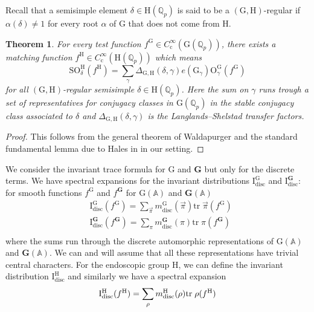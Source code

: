 \documentclass[10pt]{amsart}
\numberwithin{equation}{section}
\newtheorem{theorem}[equation]{Theorem}
\theoremstyle{definition}
\def\bfG{\mathbf{G}}
\def\QQ{\mathbb{Q}}
\def\rmc{\mathrm{c}}
\def\rmG{\mathrm{G}}
\def\rmH{\mathrm{H}}
\def\rmI{\mathrm{I}}
\def\rmO{\mathrm{O}}
\begin{document}
Recall that a semisimple element $\delta\in\rmH(\QQ_{p})$ is said to be a $(\rmG, \rmH)$-regular if $\alpha(\delta)\neq 1$ for every root $\alpha$ of $\rmG$ that does not come from $\rmH$.
\begin{theorem}
For every test function $f^{\rmG}\in C^{\infty}_{\rmc}(\rmG(\QQ_{p}))$, there exists a matching function $f^{\rmH}\in C^{\infty}_{\rmc}(\rmH(\QQ_{p}))$ which means
\begin{equation*}
\mathrm{SO}^{\rmH}_{\delta}(f^{\rmH})=\sum\limits_{\gamma}\Delta_{\rmG, \rmH}(\delta,\gamma)e(\rmG_{\gamma}){\rmO}^{\rmG}_{\gamma}(f^{\rmG})
\end{equation*}
for all $(\rmG, \rmH)$-regular semisimple $\delta\in\rmH(\QQ_{p})$. Here the sum on $\gamma$ runs trough a set of representatives for conjugacy classes in $\rmG(\QQ_{p})$ in the stable conjugacy class associated to $\delta$ and $\Delta_{\rmG, \rmH}(\delta, \gamma)$ is the Langlands--Shelstad transfer factors.
\end{theorem}
\begin{proof}
This follows from the general theorem of Waldapurger \cite[\S1.5 Th\`eor\'em]{Wal-trans} and the standard fundamental lemma due to Hales in \cite[Proposition]{Hal97} in our setting.
\end{proof}
We consider the invariant trace formula for $\rmG$ and $\bfG$ but only for the discrete 
terms. We have spectral expansions for the invariant distributions $\rmI^{\rmG}_{\mathrm{disc}}$ and $\rmI^{\bfG}_{\mathrm{disc}}$: for smooth functions $f^{\rmG}$ and $f^{\bfG}$ for $\rmG(\mathbb{A})$ and  $\bfG(\mathbb{A})$
\begin{equation}\label{distri1}
\begin{aligned}
&\rmI^{\rmG}_{\mathrm{disc}}(f^{\rmG})=\sum_{\vec{\pi}} m^{\rmG}_{\mathrm{disc}}(\vec{\pi})\mathrm{tr}\phantom{.}\vec{\pi}(f^{\rmG})\\
&\rmI^{\bfG}_{\mathrm{disc}}(f^{\bfG})=\sum_{\pi} m^{\bfG}_{\mathrm{disc}}(\pi)\mathrm{tr}\phantom{.}{\pi}(f^{\bfG})\\
\end{aligned}
\end{equation}
where the sums run through the discrete automorphic representations of $\rmG(\mathbb{A})$ and $\bfG(\mathbb{A})$. We can and will assume that all these representations have trivial central characters. For the endoscopic group $\rmH$, we can define the invariant distribution $\rmI^{\rmH}_{\mathrm{disc}}$ and similarly we have a spectral expansion
\begin{equation}\label{distri2}
\rmI^{\rmH}_{\mathrm{disc}}(f^{\rmH})=\sum_{\rho} m^{\rmH}_{\mathrm{disc}}(\rho)\mathrm{tr}\phantom{.}{\rho}(f^{\rmH})\\
\end{equation}
\end{document}
